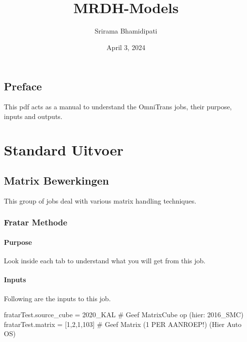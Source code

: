 \documentclass[
  letterpaper,
  DIV=11,
  numbers=noendperiod]{scrreprt}
\title{MRDH-Models}
\author{Srirama Bhamidipati}
\date{April 3, 2024}
\newenvironment{Shaded}{\begin{snugshade}}{\end{snugshade}}
\newcommand{\AttributeTok}[1]{\textcolor[rgb]{0.40,0.45,0.13}{#1}}
\newcommand{\CommentTok}[1]{\textcolor[rgb]{0.37,0.37,0.37}{#1}}
\newcommand{\DecValTok}[1]{\textcolor[rgb]{0.68,0.00,0.00}{#1}}
\newcommand{\KeywordTok}[1]{\textcolor[rgb]{0.00,0.23,0.31}{#1}}
\newcommand{\NormalTok}[1]{\textcolor[rgb]{0.00,0.23,0.31}{#1}}
\newcommand{\VerbatimStringTok}[1]{\textcolor[rgb]{0.13,0.47,0.30}{#1}}
\renewcommand*\contentsname{Table of contents}
\newcommand\contentsname{Table of contents}
\begin{document}
\maketitle

\renewcommand*\contentsname{Job index}
{
\hypersetup{linkcolor=blue}
\setcounter{tocdepth}{2}
\tableofcontents
}

\chapter*{Preface}\label{preface}


This pdf acts as a manual to understand the OmniTrans jobs, their
purpose, inputs and outputs.

\part{Standard Uitvoer}

\chapter{Matrix Bewerkingen}\label{matrix-bewerkingen}

This group of jobs deal with various matrix handling techniques.

\section{Fratar Methode}\label{fratar-methode}

\subsection{Purpose}

Look inside each tab to understand what you will get from this job.

\subsection{Inputs}

Following are the inputs to this job.

\begin{Shaded}
\begin{Highlighting}[]
\NormalTok{fratarTest}\AttributeTok{.source\_cube} \KeywordTok{=} \VerbatimStringTok{\textquotesingle{}2020\_KAL\textquotesingle{}} \CommentTok{\# Geef MatrixCube op (hier: 2016\_SMC)        }
\NormalTok{fratarTest}\AttributeTok{.matrix} \KeywordTok{=} \KeywordTok{[}\DecValTok{1}\NormalTok{,}\DecValTok{2}\NormalTok{,}\DecValTok{1}\NormalTok{,}\DecValTok{103}\KeywordTok{]}     \CommentTok{\# Geef Matrix (1 PER AANROEP!) (Hier Auto OS)}
\end{Highlighting}
\end{Shaded}
\end{document}
